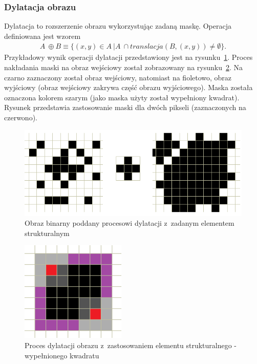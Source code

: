 \subsubsection{Dylatacja obrazu}
Dylatacja to rozszerzenie obrazu wykorzystując zadaną maskę. Operacja definiowana jest wzorem
\begin{gather*}
 A~\oplus B \equiv \{ (x, y) \in A~| A~\cap translacja(B, (x, y)) \neq \emptyset \}.
\end{gather*}
Przykładowy wynik operacji dylatacji przedstawiony jest na rysunku~\ref{fig:dilate}. Proces nakładania maski na obraz wejściowy został zobrazowany na rysunku~\ref{fig:dilate_better_example}. Na czarno zaznaczony został obraz wejściowy, natomiast na fioletowo, obraz wyjściowy (obraz wejściowy zakrywa część obrazu wyjściowego). Maska została oznaczona kolorem szarym (jako maska użyty został wypełniony kwadrat). Rysunek przedstawia zastosowanie maski dla dwóch pikseli (zaznaczonych na czerwono).
\begin{figure}
  \centering
  \includegraphics[width=15cm]{img/dilate}
  \caption{Obraz binarny poddany procesowi dylatacji z~zadanym elementem strukturalnym}
  \label{fig:dilate}
\end{figure}
\begin{figure}
  \centering
  \includegraphics[width=5cm]{img/dilate-better-example}
  \caption{Proces dylatacji obrazu z~zastosowaniem elementu strukturalnego - wypełnionego kwadratu}
  \label{fig:dilate_better_example}
\end{figure}
